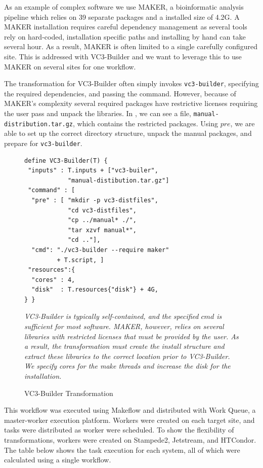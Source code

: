 \documentclass[conference]{IEEEtran}
\begin{document}
As an example of complex software we use MAKER\cite{pmid18025269},
a bioinformatic analysis pipeline which relies
on 39 separate packages and a installed size of 4.2G.
A MAKER installation requires careful
dependency management as several tools rely
on hard-coded, installation specific paths
and installing by hand can take several hour.
As a result, MAKER is often limited to a single
carefully configured site.
This is addressed with VC3-Builder and
we want to leverage this to use MAKER 
on several sites for one workflow.

The transformation for VC3-Builder often
simply invokes {\tt vc3-builder},
specifying the required dependencies,
and passing the command.
However, because of MAKER's complexity several
required packages have restrictive licenses
requiring the user 
pass and unpack the libraries.
In , we can see a file,
{\tt manual-distribution.tar.gz}, which
contains the restricted packages.
Using $pre$, we are able to set up the
correct directory structure,
unpack the manual packages,
and prepare for {\tt vc3-builder}.


\begin{figure}
\begin{framed}
\begin{verbatim}
define VC3-Builder(T) {
 "inputs" : T.inputs + ["vc3-builer",
            "manual-distibution.tar.gz"]
 "command" : [
  "pre" : [ "mkdir -p vc3-distfiles",
            "cd vc3-distfiles",
            "cp ../manual* ./",
            "tar xzvf manual*",
            "cd .."],
  "cmd": "./vc3-builder --require maker"
         + T.script, ]
 "resources":{
  "cores" : 4,
  "disk"  : T.resources{"disk"} + 4G,
} }
\end{verbatim}
\end{framed}
\caption{VC3-Builder Transformation}
\small
\emph{VC3-Builder is typically  
self-contained, and the specified
$cmd$ is sufficient for most software.
MAKER, however, relies on several libraries
with restricted licenses that must be
provided by the user. 
As a result, the transformation must
create the install structure and 
extract these libraries to the correct
location prior to VC3-Builder.
We specify cores for the make threads and 
increase the disk for the installation.
}
\label{vc3-builder}
\end{figure}

This workflow was executed using Makeflow
and distributed with Work Queue\cite{wq-python-pyhpc2011},
a master-worker execution platform. 
Workers were created on each target site,
and tasks were distributed as worker were 
scheduled.
To show the flexibility of transformations,
workers were created on Stampede2,
Jetstream, and HTCondor.
The table below shows the task execution
for each system, 
all of which were calculated using a single workflow.
\end{document}
